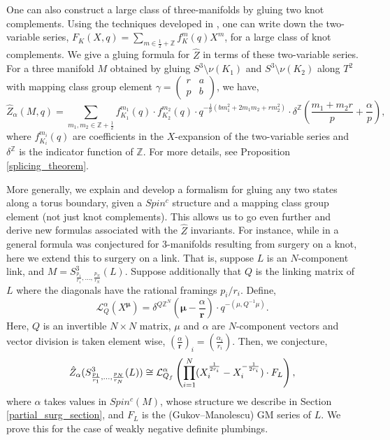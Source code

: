 \documentclass{article}
\newcommand{\Z}{{\mathbb Z}}
\numberwithin{corollary}{theorem}
\numberwithin{corollary}{proposition}
\begin{document}
One can also construct a large class of three-manifolds by gluing two knot complements. Using the techniques developed in \cite{GM, S2}, one can write down the two-variable series, $F_{K}(X,q) = \sum_{m \in \frac{1}{2}+ \Z}  f_{K}^{m}(q) X^{m} $, for a large class of knot complements. We give a gluing formula for $\hat{Z}$ in terms of these two-variable series. For a three manifold $M$ obtained by gluing $S^3 \setminus \nu(K_1)$ and $S^3 \setminus \nu(K_2)$ along $T^{2}$ with mapping class group element $\gamma = \begin{pmatrix}
    r & a\\
    p & b
\end{pmatrix}$, we have,
$$  \hat{Z}_{\alpha}(M,q) = \sum_{m_1,m_2 \in \mathbb{Z}+\frac{1}{2}} f^{m_1}_{K_1}(q)\cdot f^{m_2}_{K_2}(q) \cdot q^{-\frac{1}{p}(b m_{1}^{2}+2 m_{1} m_{2}+ r m_{2}^{2})} \cdot \delta^\Z\left(\frac{m_{1}+m_{2} r}{p}+ \frac{\alpha}{p}  \right),  $$
where $f^{m_i}_{K_i}(q)$  are coefficients in the $X$-expansion of the two-variable series and  $\delta^\Z$ is the indicator function of $\Z$. For more details, see Proposition \ref{splicing_theorem}.

More generally, we explain and develop a formalism for gluing any two states along a torus boundary, given a $Spin^c$ structure and a mapping class group element (not just knot complements). This allows us to go even further and derive new formulas associated with the $\hat{Z}$ invariants. For instance, while in \cite{GM} a general formula was conjectured for 3-manifolds resulting from surgery on a knot, here we extend this to surgery on a link. That is, suppose $L$ is an $N$-component link, and $M = S^3_{\frac{p_1}{r_1},\ldots,\frac{p_N}{r_N}}(L)$. Suppose additionally that $Q$ is the linking matrix of $L$ where the diagonals have the rational framings $p_i/r_i$. Define,
$$\mathcal{L}^\alpha_{Q}  (X^\mathbf{\mu}) = \delta^{Q \mathbb{Z}^N} (\mathbf{\mu} - \frac{\alpha}{\mathbf{r}}) \cdot q^{-(\mu,Q^{-1} \mu)}.$$    
Here, $Q$ is an invertible $N\times N $ matrix, $\mu$ and $\alpha$ are $N$-component vectors and vector division is taken element wise, $(\frac{\alpha}{\mathbf{r}})_i = (\frac{\alpha_i}{r_i})$. Then, we conjecture, 
 $$\Hat{Z}_\alpha (S^3_{\frac{p_1}{r_1},\ldots, \frac{p_N}{r_N} } (L)) \cong \mathcal{L}^\alpha_{Q_f} \left( \prod^N_{i=1}(X_i^{\frac{1}{2r_i}} - X_i^{-\frac{1}{2r_i}}) \cdot F_L\right), $$
 where $\alpha$ takes values in $Spin^c(M)$, whose structure we describe in Section \ref{partial_surg_section}, and $F_L$ is the (Gukov--Manolescu) GM series of $L$. We prove this for the case of weakly negative definite plumbings. 
\end{document}
